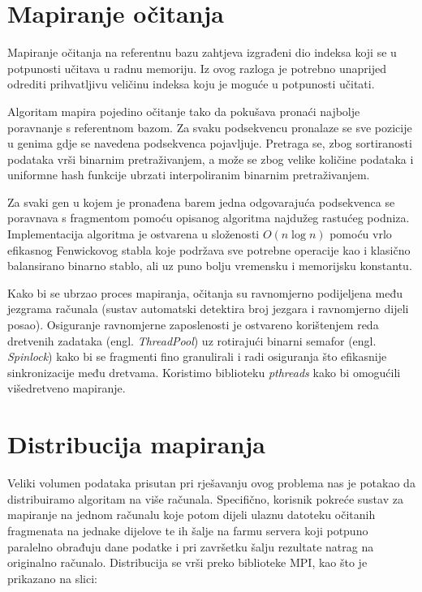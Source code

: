 \documentclass[times, utf8, diplomski]{fer}
\begin{document}
\section{Mapiranje očitanja}

Mapiranje očitanja na referentnu bazu zahtjeva izgrađeni dio indeksa koji se u potpunosti učitava u radnu memoriju. Iz ovog razloga je potrebno unaprijed odrediti prihvatljivu veličinu indeksa koju je moguće u potpunosti učitati.

Algoritam mapira pojedino očitanje tako da pokušava pronaći najbolje poravnanje s referentnom bazom. Za svaku
podsekvencu pronalaze se sve pozicije u genima gdje se navedena podsekvenca pojavljuje. Pretraga se, zbog
sortiranosti podataka vrši binarnim pretraživanjem, a može se zbog velike količine podataka i uniformne hash
funkcije ubrzati interpoliranim binarnim pretraživanjem. \cite{weiss1998data}

Za svaki gen u kojem je pronađena barem jedna odgovarajuća podsekvenca se poravnava s fragmentom pomoću opisanog
algoritma najdužeg rastućeg podniza. Implementacija algoritma je ostvarena u složenosti $O(n \log n)$ pomoću
vrlo efikasnog Fenwickovog stabla koje podržava sve potrebne operacije kao i klasično balansirano binarno stablo,
ali uz puno bolju vremensku i memorijsku konstantu. \cite{fenwick1994new}

Kako bi se ubrzao proces mapiranja, očitanja su ravnomjerno podijeljena među jezgrama računala (sustav
automatski detektira broj jezgara i ravnomjerno dijeli posao). Osiguranje ravnomjerne zaposlenosti je ostvareno
korištenjem reda dretvenih zadataka (engl. \emph{ThreadPool}) uz rotirajući binarni semafor (engl. \emph{Spinlock})
kako bi se fragmenti fino granulirali i radi osiguranja što efikasnije sinkronizacije među dretvama. Koristimo
biblioteku \emph{pthreads} kako bi omogućili višedretveno mapiranje.

\section{Distribucija mapiranja}
Veliki volumen podataka prisutan pri rješavanju ovog problema nas je potakao da distribuiramo algoritam na
više računala. Specifično, korisnik pokreće sustav za mapiranje na jednom računalu koje potom dijeli ulaznu 
datoteku očitanih fragmenata na jednake dijelove te ih šalje na farmu servera koji potpuno paralelno obrađuju
dane podatke i pri završetku šalju rezultate natrag na originalno računalo. Distribucija se vrši preko biblioteke
MPI\cite{gabriel04:_open_mpi}, kao što je prikazano na slici:
\end{document}
